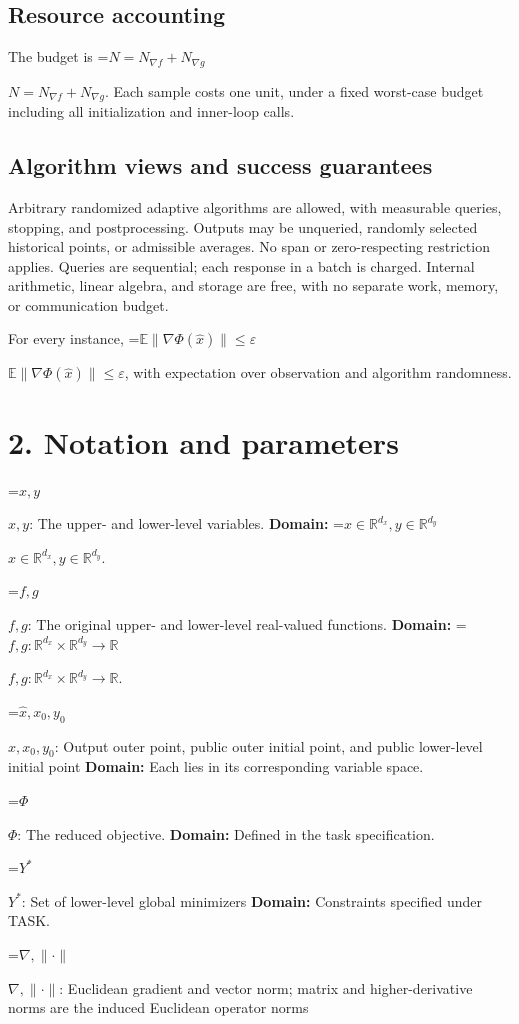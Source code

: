 \documentclass[10pt,a4paper]{article}
\newcommand{\AtlasMath}[1]{\par\begingroup\centering\setbox0=\hbox{$\displaystyle #1$}\ifdim\wd0>1.4\linewidth\typeout{ATLAS WIDE FORMULA: \the\wd0}\fi\ifdim\wd0>\linewidth\resizebox{\linewidth}{!}{\box0}\else\box0\fi\par\endgroup}
\newcommand{\AtlasInlineMath}[1]{\begingroup\setbox0=\hbox{$#1$}\ifdim\wd0>.4\linewidth\endgroup\AtlasMath{#1}\else\endgroup$#1$\fi}
\begin{document}
\subsection{Resource accounting}
The budget is \AtlasInlineMath{N=N_{\nabla f}+N_{\nabla g}}. Each sample costs one unit, under a fixed worst-case budget including all initialization and inner-loop calls.

\subsection{Algorithm views and success guarantees}
Arbitrary randomized adaptive algorithms are allowed, with measurable queries, stopping, and postprocessing. Outputs may be unqueried, randomly selected historical points, or admissible averages. No span or zero-respecting restriction applies. Queries are sequential; each response in a batch is charged. Internal arithmetic, linear algebra, and storage are free, with no separate work, memory, or communication budget.

For every instance, \AtlasInlineMath{\mathbb E\|\nabla\Phi(\widehat x)\|\le\varepsilon}, with expectation over observation and algorithm randomness.

\section{2. Notation and parameters}
\AtlasInlineMath{x,y}: The upper- and lower-level variables. \textbf{Domain:} \AtlasInlineMath{x\in\mathbb R^{d_x},y\in\mathbb R^{d_y}}.

\AtlasInlineMath{f,g}: The original upper- and lower-level real-valued functions. \textbf{Domain:} \AtlasInlineMath{f,g:\mathbb R^{d_x}\times\mathbb R^{d_y}\to\mathbb R}.

\AtlasInlineMath{\widehat x,x_0,y_0}: Output outer point, public outer initial point, and public lower-level initial point \textbf{Domain:} Each lies in its corresponding variable space.

\AtlasInlineMath{\Phi}: The reduced objective. \textbf{Domain:} Defined in the task specification.

\AtlasInlineMath{Y^*}: Set of lower-level global minimizers \textbf{Domain:} Constraints specified under TASK.

\AtlasInlineMath{\nabla,\|\cdot\|}: Euclidean gradient and vector norm; matrix and higher-derivative norms are the induced Euclidean operator norms
\end{document}
